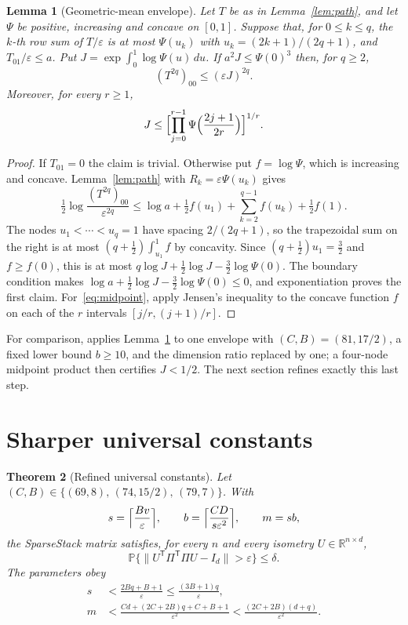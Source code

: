 \documentclass[11pt,a4paper]{article}
\newtheorem{theorem}{Theorem}[section]
\newtheorem{lemma}[theorem]{Lemma}
\theoremstyle{definition}
\theoremstyle{remark}
\newcommand{\Prob}{\mathbb P}
\newcommand{\R}{\mathbb R}
\newcommand{\eps}{\varepsilon}
\newcommand{\norm}[1]{\lVert#1\rVert}
\newcommand{\1}{\mathbf 1}
\newcommand{\T}{\mathsf T}
\begin{document}
\begin{lemma}[Geometric-mean envelope]\label{lem:gm}
Let $T$ be as in Lemma~\ref{lem:path}, and let $\Psi$ be positive,
increasing and concave on $[0,1]$. Suppose that, for $0\le k\le q$, the
$k$-th row sum of $T/\eps$ is at most $\Psi(u_k)$ with
$u_k=(2k+1)/(2q+1)$, and $T_{01}/\eps\le a$. Put
$J=\exp\int_0^1\log\Psi(u)\,du$. If $a^2J\le\Psi(0)^3$ then, for $q\ge2$,
\[
 (T^{2q})_{00}\le(\eps J)^{2q}.
\]
Moreover, for every $r\ge1$,
\begin{equation}\label{eq:midpoint}
 J\le\Bigl[\prod_{j=0}^{r-1}\Psi\Bigl(\frac{2j+1}{2r}\Bigr)\Bigr]^{1/r}.
\end{equation}
\end{lemma}
\begin{proof}
If $T_{01}=0$ the claim is trivial. Otherwise put $f=\log\Psi$, which is
increasing and concave. Lemma~\ref{lem:path} with $R_k=\eps\Psi(u_k)$
gives
\[
 \tfrac12\log\frac{(T^{2q})_{00}}{\eps^{2q}}
 \le\log a+\tfrac12f(u_1)+\sum_{k=2}^{q-1}f(u_k)+\tfrac12f(1).
\]
The nodes $u_1<\cdots<u_q=1$ have spacing $2/(2q+1)$, so the trapezoidal
sum on the right is at most $(q+\frac12)\int_{u_1}^1f$ by concavity. Since
$(q+\frac12)u_1=\frac32$ and $f\ge f(0)$, this is at most
$q\log J+\frac12\log J-\frac32\log\Psi(0)$. The boundary condition makes
$\log a+\frac12\log J-\frac32\log\Psi(0)\le0$, and exponentiation proves
the first claim. For~\eqref{eq:midpoint}, apply Jensen's inequality to the
concave function $f$ on each of the $r$ intervals $[j/r,(j+1)/r]$.
\end{proof}

For comparison, \cite{SS} applies Lemma~\ref{lem:gm} to one envelope
with $(C,B)=(81,17/2)$, a fixed lower bound $b\ge10$, and the dimension
ratio replaced by one; a four-node midpoint product then certifies
$J<1/2$. The next section refines exactly this last step.

\section{Sharper universal constants}\label{sec:constants}

\begin{theorem}[Refined universal constants]\label{thm:constants}
Let $(C,B)\in\{(69,8),\,(74,15/2),\,(79,7)\}$. With
\[
 s=\Bigl\lceil\frac{Bv}{\eps}\Bigr\rceil,\qquad
 b=\Bigl\lceil\frac{CD}{s\eps^2}\Bigr\rceil,\qquad m=sb,
\]
the SparseStack matrix satisfies, for every $n$ and every isometry
$U\in\R^{n\times d}$,
\[
 \Prob\{\norm{U^\T\Pi^\T\Pi U-I_d}>\eps\}\le\delta.
\]
The parameters obey
\begin{align}
 s&<\frac{2Bq+B+1}{\eps}\le\frac{(3B+1)q}{\eps},\label{eq:s-size}\\
 m&<\frac{Cd+(2C+2B)q+C+B+1}{\eps^2}<\frac{(2C+2B)(d+q)}{\eps^2}.
 \label{eq:m-size}
\end{align}
\end{theorem}
\end{document}
